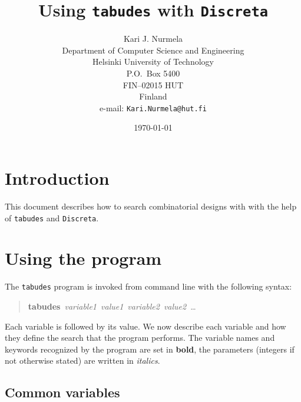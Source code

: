 \documentclass[12pt,a4paper]{article}
\begin{document}
\makeatletter
\newenvironment{owndescription}
               {\list{}{\labelwidth\z@ \itemindent-\leftmargin
                        \let\makelabel\owndescriptionlabel}}
               {\endlist}
\newcommand*\owndescriptionlabel[1]{\hspace\labelsep
  \normalfont #1}
\makeatother

\title{Using \texttt{tabudes} with \texttt{Discreta}}

\author{Kari J. Nurmela\\
Department of Computer Science and Engineering\\
Helsinki University of Technology\\
P.O.\ Box 5400\\
FIN--02015 HUT\\
Finland\\e-mail: \texttt{Kari.Nurmela@hut.fi}}

\date{\today}

\maketitle

\section{Introduction}
\label{sec:intro}

This document describes how to search combinatorial designs with
with the help of \texttt{tabudes} and \texttt{Discreta}.

\section{Using the program}

\newcommand{\Var}[1]{\textbf{#1}}
\newcommand{\Val}[1]{\textit{#1}}
\newcommand{\NIY}{\textit{(not implemented yet)}}

The \texttt{tabudes} program is invoked from command line with the
following syntax:
\begin{quote}
  \Var{tabudes}\ \Val{variable1}\ \Val{value1}\ \Val{variable2}\
  \Val{value2}\ \ldots
\end{quote}
Each variable is followed by its value. We now describe each variable
and how they define the search that the program performs. The variable
names and keywords recognized by the program are set in \Var{bold},
the parameters (integers if not otherwise stated) are written in
\Val{italics}.

\subsection{Common variables}
\end{document}
